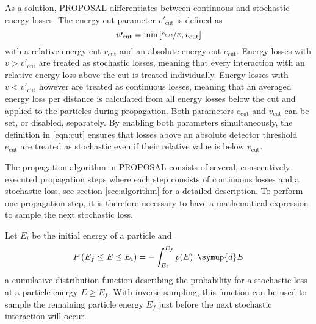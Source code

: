 As a solution, PROPOSAL differentiates between continuous and stochastic energy losses.
The energy cut parameter $v\prime_\text{cut}$ is defined as
%
\begin{equation}
	\label{eqn:cut}
	v\prime_\text{cut} = \text{min}\left[\sfrac{e_\text{cut}}{E}, v_\text{cut} \right]
\end{equation}
%
with a relative energy cut $v_\text{cut}$ and an absolute energy cut $e_\text{cut}$.
Energy losses with $v > v\prime_\text{cut}$ are treated as stochastic losses, meaning that every interaction with an relative energy loss above the cut is treated individually.
Energy losses with $v < v\prime_\text{cut}$ however are treated as continuous losses, meaning that an averaged energy loss per distance is calculated from all energy losses below the cut and applied to the particles during propagation.
Both parameters $e_{\text{cut}}$ and $v_{\text{cut}}$ can be set, or disabled, separately.
By enabling both parameters simultaneously, the definition in \eqref{eqn:cut} ensures that losses above an absolute detector threshold $e_\text{cut}$ are treated as stochastic even if their relative value is below $v_{\text{cut}}$.

The propagation algorithm in PROPOSAL consists of several, consecutively executed propagation steps where each step consists of continuous losses and a stochastic loss, see section \ref{sec:algorithm} for a detailed description.
To perform one propagation step, it is therefore necessary to have a mathematical expression to sample the next stochastic loss.

Let $E_i$ be the initial energy of a particle and
%
\begin{equation}
	\label{eqn:cum}
	P\left(E_f \leq E \leq E_i\right) = - \int_{E_i}^{E_f} p(E) \, \symup{d}E
\end{equation}
%
a cumulative distribution function describing the probability for a stochastic loss at a particle energy $E \geq E_f$.
With inverse sampling, this function can be used to sample the remaining particle energy $E_f$ just before the next stochastic interaction will occur.

